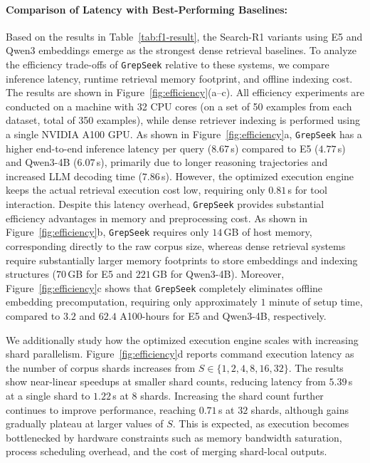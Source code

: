 \documentclass{llmxive}
\providecommand{\ourmethod}{\texttt{GrepSeek}\xspace}
\begin{document}
\paragraph{Comparison of Latency with Best-Performing Baselines:}

Based on the results in Table~\ref{tab:f1-result}, the Search-R1 variants using E5 and Qwen3 embeddings emerge as the strongest dense retrieval baselines. To analyze the efficiency trade-offs of \ourmethod{} relative to these systems, we compare inference latency, runtime retrieval memory footprint, and offline indexing cost. The results are shown in Figure~\ref{fig:efficiency}(a--c). All efficiency experiments are conducted on a machine with 32 CPU cores (on a set of 50 examples from each dataset, total of 350 examples), while dense retriever indexing is performed using a single NVIDIA A100 GPU. As shown in Figure~\ref{fig:efficiency}a, \ourmethod{} has a higher end-to-end inference latency per query ($8.67$\,s) compared to E5 ($4.77$\,s) and Qwen3-4B ($6.07$\,s), primarily due to longer reasoning trajectories and increased LLM decoding time ($7.86$\,s). However, the optimized execution engine keeps the actual retrieval execution cost low, requiring only $0.81$\,s for tool interaction. Despite this latency overhead, \ourmethod{} provides substantial efficiency advantages in memory and preprocessing cost. As shown in Figure~\ref{fig:efficiency}b, \ourmethod{} requires only $14$\,GB of host memory, corresponding directly to the raw corpus size, whereas dense retrieval systems require substantially larger memory footprints to store embeddings and indexing structures ($70$\,GB for E5 and $221$\,GB for Qwen3-4B). Moreover, Figure~\ref{fig:efficiency}c shows that \ourmethod{} completely eliminates offline embedding precomputation, requiring only approximately $1$ minute of setup time, compared to $3.2$ and $62.4$ A100-hours for E5 and Qwen3-4B, respectively.



We additionally study how the optimized execution engine scales with increasing shard parallelism. Figure~\ref{fig:efficiency}d reports command execution latency as the number of corpus shards increases from $S \in \{1,2,4,8,16,32\}$. The results show near-linear speedups at smaller shard counts, reducing latency from $5.39$\,s at a single shard to $1.22$\,s at $8$ shards. Increasing the shard count further continues to improve performance, reaching $0.71$\,s at $32$ shards, although gains gradually plateau at larger values of $S$. This is expected, as execution becomes bottlenecked by hardware constraints such as memory bandwidth saturation, process scheduling overhead, and the cost of merging shard-local outputs.
\end{document}
